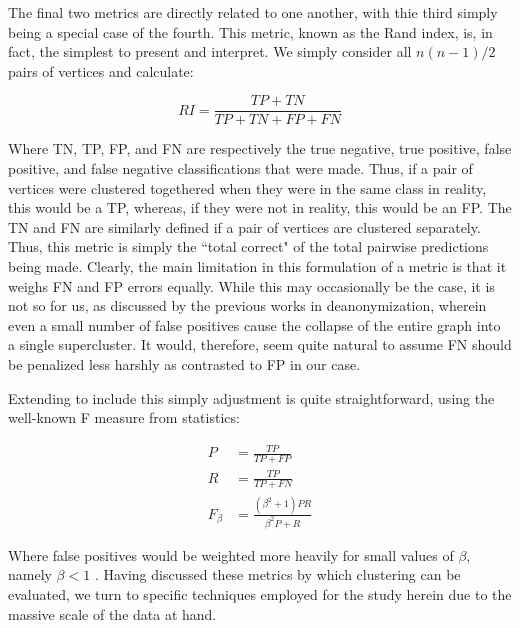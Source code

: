 \documentclass{article}
\begin{document}
The final two metrics are directly related to one another, with thie third simply being a special case of the fourth. This metric, known as the Rand index, is, in fact, the simplest to present and interpret. We simply consider all $n(n-1)/2$ pairs of vertices and calculate:

$$ RI = \frac{TP + TN}{TP + TN + FP + FN} $$

Where TN, TP, FP, and FN are respectively the true negative, true positive, false positive, and false negative classifications that were made. Thus, if a pair of vertices were clustered togethered when they were in the same class in reality, this would be a TP, whereas, if they were not in reality, this would be an FP. The TN and FN are similarly defined if a pair of vertices are clustered separately. Thus, this metric is simply the ``total correct" of the total pairwise predictions being made. Clearly, the main limitation in this formulation of a metric is that it weighs FN and FP errors equally. While this may occasionally be the case, it is not so for us, as discussed by the previous works in deanonymization, wherein even a small number of false positives cause the collapse of the entire graph into a single supercluster. It would, therefore, seem quite natural to assume FN should be penalized less harshly as contrasted to FP in our case.

Extending to include this simply adjustment is quite straightforward, using the well-known F measure from statistics:

\begin{align}
P &= \frac{TP}{TP+FP} \\
R &= \frac{TP}{TP+FN} \\
F_{\beta} &= \frac{(\beta^2+1)PR}{\beta^2 P+R}
\end{align}

Where false positives would be weighted more heavily for small values of $\beta$, namely $\beta<1$ \cite{evaluation}. Having discussed these metrics by which clustering can be evaluated, we turn to specific techniques employed for the study herein due to the massive scale of the data at hand.
\end{document}
